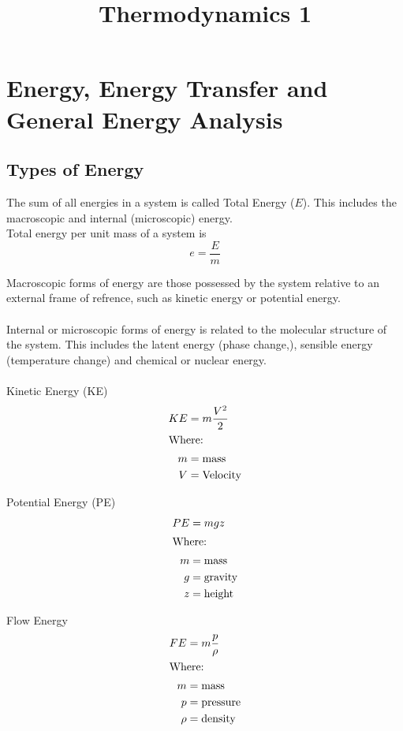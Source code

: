 \documentclass[12pt,a4paper]{article}
\begin{document}
\title{Thermodynamics 1}
\date{}
\maketitle

\newpage

\tableofcontents

\newpage

\section{Energy, Energy Transfer and General Energy Analysis}
    \subsection{Types of Energy}
        The sum of all energies in a system is called Total Energy ($E$). This includes the macroscopic and internal (microscopic) energy. \\
        Total energy per unit mass of a system is
        \[e=\frac{E}{m}\]

        Macroscopic forms of energy are those possessed by the system relative to an external frame of refrence, such as kinetic energy or potential energy. \\
        \\
        Internal or microscopic forms of energy is related to the molecular structure of the system. This includes the latent energy (phase change,), sensible energy (temperature change) and chemical or nuclear energy. \\
        \\
        Kinetic Energy (KE)
        \begin{align}
            KE&=m\frac{V^2}{2} \\
            \intertext{Where:}
            m &= \text{mass} \nonumber \\
            V&=\text{Velocity} \nonumber
        \end{align}

        Potential Energy (PE)
        \begin{align}
            PE&=mgz \\
            \intertext{Where:}
            m&=\text{mass} \nonumber \\
            g&=\text{gravity} \nonumber \\
            z&=\text{height} \nonumber 
        \end{align}

        Flow Energy
        \begin{align}
            FE &=m\frac{p}{\rho} \\
            \intertext{Where: }
            m&=\text{mass} \nonumber \\
            p&=\text{pressure} \nonumber \\
            \rho&=\text{density} \nonumber
        \end{align}
\end{document}
